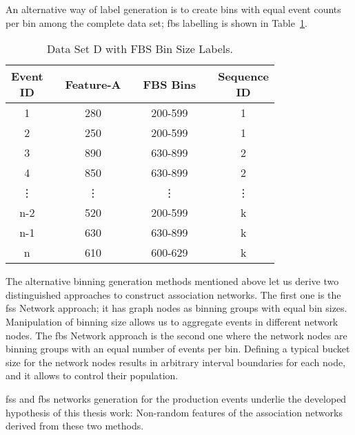 An alternative way of label generation is to create bins with equal event counts per bin among the complete data set; \ac{fbs} labelling is shown in Table~\ref{Tab: D-dataset-FBS}.
\begin{table}[ht!]
	\centering
	\setlength{\arrayrulewidth}{0.75pt}%
	\caption{Data Set D with FBS Bin Size Labels.}
	\begin{tabular}{|cc|c|ccc|c|}
		\hline \rowcolor[HTML]{FFFFC7}
		\makecell{Event\\ID} 	&& Feature-A    	&& FBS Bins && \makecell{Sequence\\ID} \\ \hline
		1 	      && 280	    && 200-599	&& 1 		     \\
		2 		  && 250	    && 200-599	&& 1 		     \\
		3 	      && 890	    && 630-899	&& 2 		     \\
		4 		  && 850	    && 630-899	&& 2 		     \\
		\vdots	  && \vdots  	&& \vdots	&& \vdots 	     \\
		n-2 	  && 520	    && 200-599	&& k 		     \\
		n-1       && 630	    && 630-899	&& k 		     \\
		n 		  && 610	    && 600-629	&& k 		     \\ \hline
	\end{tabular}
	\label{Tab: D-dataset-FBS}
\end{table}
The alternative binning generation methods mentioned above let us derive two distinguished approaches to construct association networks. The first one is the \acs{fss} Network approach; it has graph nodes as binning groups with equal bin sizes. Manipulation of binning size allows us to aggregate events in different network nodes. The \acs{fbs} Network approach is the second one where the network nodes are binning groups with an equal number of events per bin. Defining a typical bucket size for the network nodes results in arbitrary interval boundaries for each node, and it allows to control their population.


\acs{fss} and \acs{fbs} networks generation for the production events underlie the developed hypothesis of this thesis work: Non-random features of the association networks derived from these two methods.